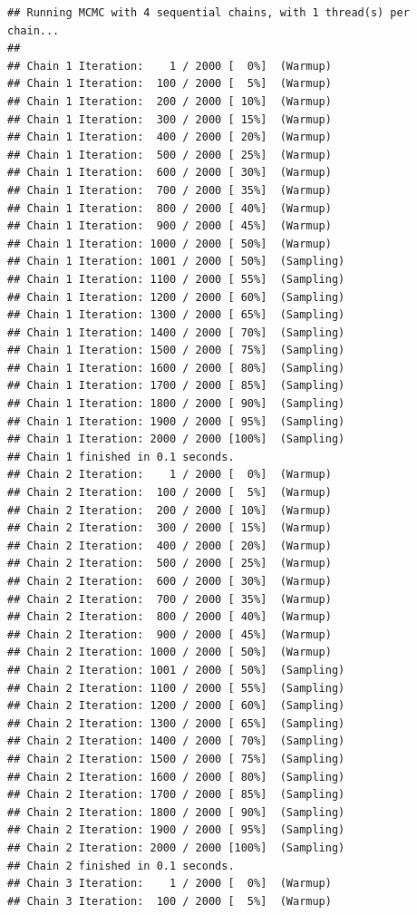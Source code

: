 \documentclass[
]{article}
\begin{document}
\begin{verbatim}
## Running MCMC with 4 sequential chains, with 1 thread(s) per chain...
## 
## Chain 1 Iteration:    1 / 2000 [  0%]  (Warmup) 
## Chain 1 Iteration:  100 / 2000 [  5%]  (Warmup) 
## Chain 1 Iteration:  200 / 2000 [ 10%]  (Warmup) 
## Chain 1 Iteration:  300 / 2000 [ 15%]  (Warmup) 
## Chain 1 Iteration:  400 / 2000 [ 20%]  (Warmup) 
## Chain 1 Iteration:  500 / 2000 [ 25%]  (Warmup) 
## Chain 1 Iteration:  600 / 2000 [ 30%]  (Warmup) 
## Chain 1 Iteration:  700 / 2000 [ 35%]  (Warmup) 
## Chain 1 Iteration:  800 / 2000 [ 40%]  (Warmup) 
## Chain 1 Iteration:  900 / 2000 [ 45%]  (Warmup) 
## Chain 1 Iteration: 1000 / 2000 [ 50%]  (Warmup) 
## Chain 1 Iteration: 1001 / 2000 [ 50%]  (Sampling) 
## Chain 1 Iteration: 1100 / 2000 [ 55%]  (Sampling) 
## Chain 1 Iteration: 1200 / 2000 [ 60%]  (Sampling) 
## Chain 1 Iteration: 1300 / 2000 [ 65%]  (Sampling) 
## Chain 1 Iteration: 1400 / 2000 [ 70%]  (Sampling) 
## Chain 1 Iteration: 1500 / 2000 [ 75%]  (Sampling) 
## Chain 1 Iteration: 1600 / 2000 [ 80%]  (Sampling) 
## Chain 1 Iteration: 1700 / 2000 [ 85%]  (Sampling) 
## Chain 1 Iteration: 1800 / 2000 [ 90%]  (Sampling) 
## Chain 1 Iteration: 1900 / 2000 [ 95%]  (Sampling) 
## Chain 1 Iteration: 2000 / 2000 [100%]  (Sampling) 
## Chain 1 finished in 0.1 seconds.
## Chain 2 Iteration:    1 / 2000 [  0%]  (Warmup) 
## Chain 2 Iteration:  100 / 2000 [  5%]  (Warmup) 
## Chain 2 Iteration:  200 / 2000 [ 10%]  (Warmup) 
## Chain 2 Iteration:  300 / 2000 [ 15%]  (Warmup) 
## Chain 2 Iteration:  400 / 2000 [ 20%]  (Warmup) 
## Chain 2 Iteration:  500 / 2000 [ 25%]  (Warmup) 
## Chain 2 Iteration:  600 / 2000 [ 30%]  (Warmup) 
## Chain 2 Iteration:  700 / 2000 [ 35%]  (Warmup) 
## Chain 2 Iteration:  800 / 2000 [ 40%]  (Warmup) 
## Chain 2 Iteration:  900 / 2000 [ 45%]  (Warmup) 
## Chain 2 Iteration: 1000 / 2000 [ 50%]  (Warmup) 
## Chain 2 Iteration: 1001 / 2000 [ 50%]  (Sampling) 
## Chain 2 Iteration: 1100 / 2000 [ 55%]  (Sampling) 
## Chain 2 Iteration: 1200 / 2000 [ 60%]  (Sampling) 
## Chain 2 Iteration: 1300 / 2000 [ 65%]  (Sampling) 
## Chain 2 Iteration: 1400 / 2000 [ 70%]  (Sampling) 
## Chain 2 Iteration: 1500 / 2000 [ 75%]  (Sampling) 
## Chain 2 Iteration: 1600 / 2000 [ 80%]  (Sampling) 
## Chain 2 Iteration: 1700 / 2000 [ 85%]  (Sampling) 
## Chain 2 Iteration: 1800 / 2000 [ 90%]  (Sampling) 
## Chain 2 Iteration: 1900 / 2000 [ 95%]  (Sampling) 
## Chain 2 Iteration: 2000 / 2000 [100%]  (Sampling) 
## Chain 2 finished in 0.1 seconds.
## Chain 3 Iteration:    1 / 2000 [  0%]  (Warmup) 
## Chain 3 Iteration:  100 / 2000 [  5%]  (Warmup) 

\end{verbatim}
\end{document}
